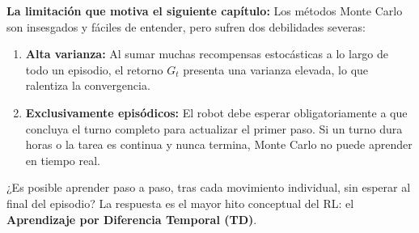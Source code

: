 \begin{notabox}
\textbf{La limitación que motiva el siguiente capítulo:} Los métodos Monte Carlo son insesgados y fáciles de entender, pero sufren dos debilidades severas:
\begin{enumerate}
  \item \textbf{Alta varianza:} Al sumar muchas recompensas estocásticas a lo largo de todo un episodio, el retorno $G_t$ presenta una varianza elevada, lo que ralentiza la convergencia.
  \item \textbf{Exclusivamente episódicos:} El robot debe esperar obligatoriamente a que concluya el turno completo para actualizar el primer paso. Si un turno dura horas o la tarea es continua y nunca termina, Monte Carlo no puede aprender en tiempo real.
\end{enumerate}
¿Es posible aprender paso a paso, tras cada movimiento individual, sin esperar al final del episodio? La respuesta es el mayor hito conceptual del RL: el \textbf{Aprendizaje por Diferencia Temporal (TD)}.
\end{notabox}
